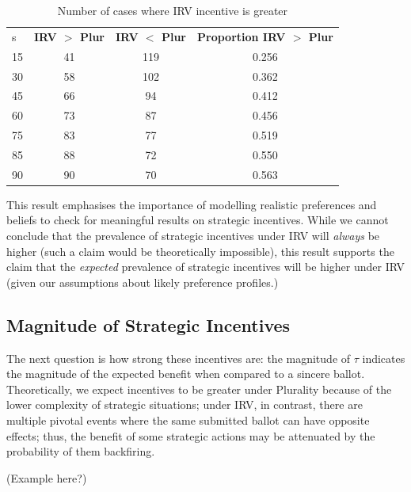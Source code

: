 \documentclass[11pt, letter]{article}
\begin{document}
\begin{table}[!htb]
	\caption{Number of cases where IRV incentive is greater}
	\label{tab:strat_inc}
	\centering

	\begin{tabular}{lccc}
	\toprule
	s & \textbf{IRV $>$ Plur} & \textbf{IRV $<$ Plur} & \textbf{Proportion IRV $>$ Plur} \\
	\cmidrule{2-4}
	15 & 41 & 119 & 0.256 \\
	30 & 58 & 102 & 0.362 \\
	45 & 66 & 94 & 0.412 \\
	60 & 73 & 87 & 0.456 \\
	75 & 83 & 77 & 0.519 \\
	85 & 88 & 72 & 0.550 \\
	90 & 90 & 70 & 0.563 \\
	\bottomrule
	\end{tabular}
\end{table}

This result emphasises the importance of modelling realistic preferences and beliefs to check for meaningful results on strategic incentives. While we cannot conclude that the prevalence of strategic incentives under IRV will \emph{always} be higher (such a claim would be theoretically impossible), this result supports the claim that the \emph{expected} prevalence of strategic incentives will be higher under IRV (given our assumptions about likely preference profiles.)

\subsection{Magnitude of Strategic Incentives}

The next question is how strong these incentives are: the magnitude of $\tau$ indicates the magnitude of the expected benefit when compared to a sincere ballot. Theoretically, we expect incentives to be greater under Plurality because of the lower complexity of strategic situations; under IRV, in contrast, there are multiple pivotal events where the same submitted ballot can have opposite effects; thus, the benefit of some strategic actions may be attenuated by the probability of them backfiring.

(Example here?)
\end{document}
